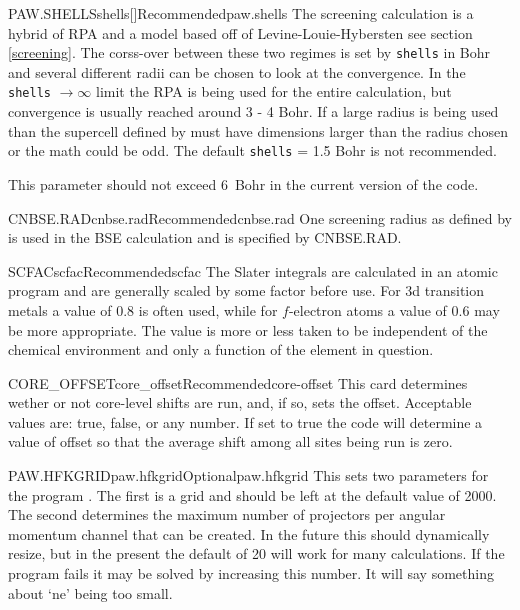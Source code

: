 \documentclass[11pt]{report}
\begin{document}
\begin{Card}{PAW.SHELLS}{shells[]}{Recommended}{paw.shells}
The screening calculation is a hybrid of RPA and a model based off of Levine-Louie-Hybersten see section \ref{screening}. The corss-over between these two regimes is set by \texttt{shells} in Bohr and several different radii can be chosen to look at the convergence. In the \texttt{shells} $\rightarrow \infty$ limit the RPA is being used for the entire calculation, but convergence is usually reached around 3 - 4 Bohr. If a large radius is being used than the supercell defined by  must have dimensions larger than the radius chosen or the math could be odd. The default \texttt{shells} = 1.5 Bohr is not recommended.

This parameter should not exceed 6~Bohr in the current version of the code.
\end{Card}

\begin{Card}{CNBSE.RAD}{cnbse.rad}{Recommended}{cnbse.rad}
One screening radius as defined by  is used in the BSE calculation and is specified by CNBSE.RAD. 
\end{Card}

\begin{Card}{SCFAC}{scfac}{Recommended}{scfac}
The Slater integrals are calculated in an atomic program and are generally scaled by some factor before use. For 3d transition metals a value of $0.8$ is often used, while for $f$-electron atoms a value of $0.6$ may be more appropriate. The value is more or less taken to be independent of the chemical environment and only a function of the element in question.
\end{Card}

\begin{Card}{CORE\_OFFSET}{core\_offset}{Recommended}{core-offset}
This card determines wether or not core-level shifts are run, and, if so, sets the offset. Acceptable values are: true, false, or any number. If set to true the code will determine a value of offset so that the average shift among all sites being run is zero. 
\end{Card}

\begin{Card}{PAW.HFKGRID}{paw.hfkgrid}{Optional}{paw.hfkgrid}
This sets two parameters for the program . The first is a grid and should be left at the default value of 2000. The second determines the maximum number of projectors per angular momentum channel that can be created. In the future this should dynamically resize, but in the present the default of 20 will work for many calculations. If the program  fails it may be solved by increasing this number. It will say something about `ne' being too small. 
\end{Card}
\end{document}

